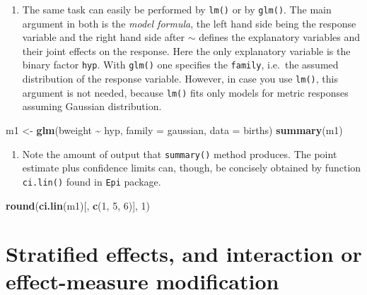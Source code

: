 \documentclass[
]{book}
\newenvironment{Shaded}{\begin{snugshade}}{\end{snugshade}}
\newcommand{\AttributeTok}[1]{\textcolor[rgb]{0.13,0.29,0.53}{#1}}
\newcommand{\DecValTok}[1]{\textcolor[rgb]{0.00,0.00,0.81}{#1}}
\newcommand{\FunctionTok}[1]{\textcolor[rgb]{0.13,0.29,0.53}{\textbf{#1}}}
\newcommand{\NormalTok}[1]{#1}
\newcommand{\OtherTok}[1]{\textcolor[rgb]{0.56,0.35,0.01}{#1}}
\newcommand{\SpecialCharTok}[1]{\textcolor[rgb]{0.81,0.36,0.00}{\textbf{#1}}}
\providecommand{\tightlist}{%
  \setlength{\itemsep}{0pt}\setlength{\parskip}{0pt}}
\begin{document}
\begin{enumerate}
\def\labelenumi{\arabic{enumi}.}
\setcounter{enumi}{1}
\tightlist
\item
  The same task can easily be performed by \texttt{lm()} or by \texttt{glm()}.
  The main argument in both
  is the \emph{model formula}, the left hand side being the response variable
  and the right hand side
  after \(\sim\) defines the explanatory variables and their
  joint effects on the response. Here the only
  explanatory variable is the binary factor \texttt{hyp}.
  With \texttt{glm()} one specifies the
  \texttt{family}, i.e.~the assumed distribution of the response variable.
  However, in case you use
  \texttt{lm()}, this argument is not needed, because \texttt{lm()} fits only
  models for metric responses assuming Gaussian distribution.
\end{enumerate}

\begin{Shaded}
\begin{Highlighting}[]
\NormalTok{m1 }\OtherTok{\textless{}{-}} \FunctionTok{glm}\NormalTok{(bweight }\SpecialCharTok{\textasciitilde{}}\NormalTok{ hyp, }\AttributeTok{family =}\NormalTok{ gaussian, }\AttributeTok{data =}\NormalTok{ births)}
\FunctionTok{summary}\NormalTok{(m1)}
\end{Highlighting}
\end{Shaded}

\begin{enumerate}
\def\labelenumi{\arabic{enumi}.}
\setcounter{enumi}{2}
\tightlist
\item
  Note the amount of output that \texttt{summary()} method produces.
  The point estimate plus confidence limits can, though, be concisely obtained by function \texttt{ci.lin()} found in \texttt{Epi} package.
\end{enumerate}

\begin{Shaded}
\begin{Highlighting}[]
\FunctionTok{round}\NormalTok{(}\FunctionTok{ci.lin}\NormalTok{(m1)[, }\FunctionTok{c}\NormalTok{(}\DecValTok{1}\NormalTok{, }\DecValTok{5}\NormalTok{, }\DecValTok{6}\NormalTok{)], }\DecValTok{1}\NormalTok{)}
\end{Highlighting}
\end{Shaded}

\section{Stratified effects, and interaction or effect-measure modification}\label{stratified-effects-and-interaction-or-effect-measure-modification}
\end{document}
